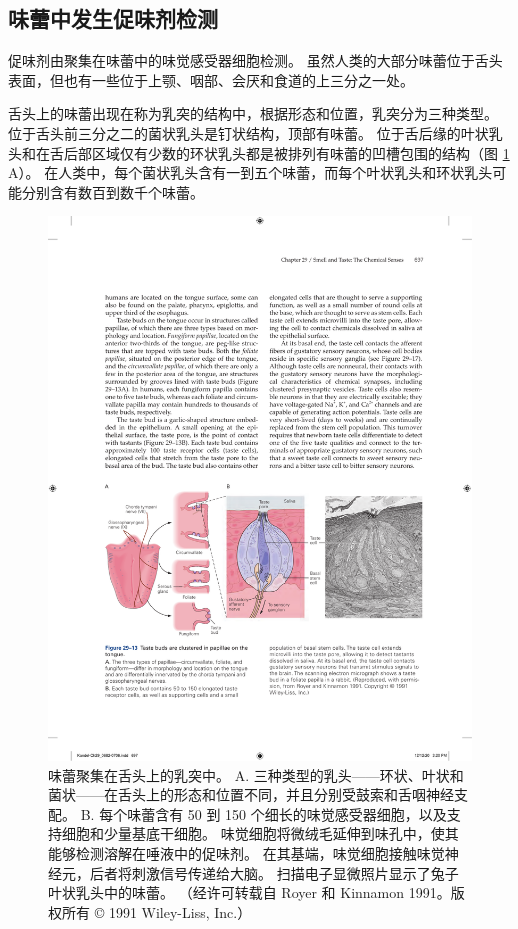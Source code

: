\subsection{味蕾中发生促味剂检测}
促味剂由聚集在味蕾中的味觉感受器细胞检测。 虽然人类的大部分味蕾位于舌头表面，但也有一些位于上颚、咽部、会厌和食道的上三分之一处。

舌头上的味蕾出现在称为乳突的结构中，根据形态和位置，乳突分为三种类型。 位于舌头前三分之二的菌状乳头是钉状结构，顶部有味蕾。 
位于舌后缘的叶状乳头和在舌后部区域仅有少数的环状乳头都是被排列有味蕾的凹槽包围的结构（图 \ref{fig:29_13} A）。 
在人类中，每个菌状乳头含有一到五个味蕾，而每个叶状乳头和环状乳头可能分别含有数百到数千个味蕾。

\begin{figure}[htbp]
	\centering
	\includegraphics[width=0.95\linewidth]{chap29/fig_29_13}
	\caption{味蕾聚集在舌头上的乳突中。 A. 三种类型的乳头——环状、叶状和菌状——在舌头上的形态和位置不同，并且分别受鼓索和舌咽神经支配。 B. 每个味蕾含有 50 到 150 个细长的味觉感受器细胞，以及支持细胞和少量基底干细胞。 味觉细胞将微绒毛延伸到味孔中，使其能够检测溶解在唾液中的促味剂。 在其基端，味觉细胞接触味觉神经元，后者将刺激信号传递给大脑。 扫描电子显微照片显示了兔子叶状乳头中的味蕾。 （经许可转载自 Royer 和 Kinnamon 1991。版权所有 © 1991 Wiley-Liss, Inc.）}
	\label{fig:29_13}
\end{figure}

